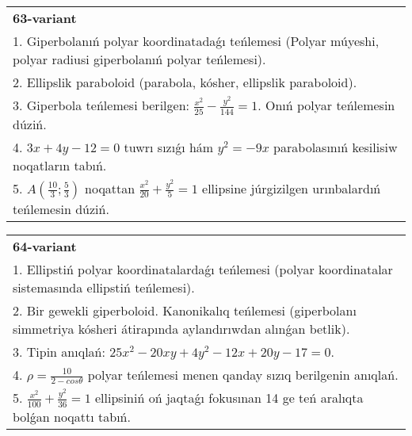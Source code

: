 \documentclass{article}
\begin{document}
\begin{tabular}{m{17cm}}
\textbf{63-variant}\\
1. Giperbolanıń polyar koordinatadaǵı teńlemesi (Polyar múyeshi, polyar radiusi giperbolanıń polyar teńlemesi).\\

2. Ellipslik paraboloid (parabola, kósher, ellipslik paraboloid).\\

3. Giperbola teńlemesi berilgen: $\frac{x^{2}}{25}-\frac{y^{2}}{144}=1$. Onıń polyar teńlemesin dúziń.\\

4. $3x + 4y - 12 = 0$ tuwrı sızıǵı hám $y^{2} = - 9x$ parabolasınıń kesilisiw noqatların tabıń.  \\

5. $A(\frac{10}{3};\frac{5}{3})$ noqattan $\frac{x^{2}}{20} + \frac{y^{2}}{5} = 1$ ellipsine júrgizilgen urınbalardıń teńlemesin dúziń.  
\end{tabular}
\vspace{1cm}


\begin{tabular}{m{17cm}}
\textbf{64-variant}\\
1. Ellipstiń polyar koordinatalardaǵı teńlemesi (polyar koordinatalar sistemasında ellipstiń teńlemesi).\\

2. Bir gewekli giperboloid. Kanonikalıq teńlemesi (giperbolanı simmetriya kósheri átirapında aylandırıwdan alınǵan betlik).\\

3. Tipin anıqlań: $25 x^{2}-20 xy+4 y^{2}-12 x+20 y-17=0$.\\

4. $\rho = \frac{10}{2 - cos\theta}$ polyar teńlemesi menen qanday sızıq berilgenin anıqlań.  \\

5. $\frac{x^{2}}{100} + \frac{y^{2}}{36} = 1$ ellipsiniń oń jaqtaǵı fokusınan 14 ge teń aralıqta bolǵan noqattı tabıń.  
\end{tabular}
\vspace{1cm}
\end{document}
